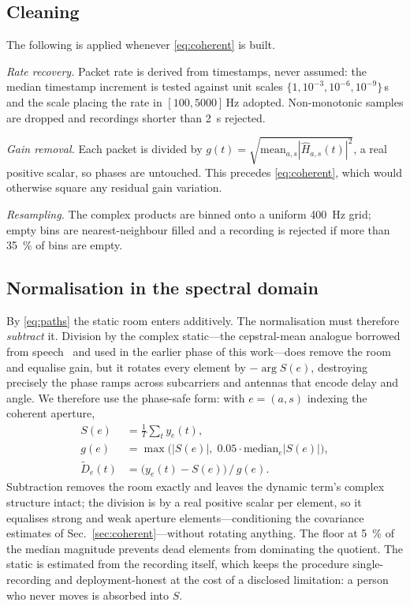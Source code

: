 \documentclass[conference]{IEEEtran}
\begin{document}
\subsection{Cleaning}
\label{sec:clean}

The following is applied whenever \eqref{eq:coherent} is built.

\emph{Rate recovery.} Packet rate is derived from timestamps, never assumed:
the median timestamp increment is tested against unit scales
$\{1, 10^{-3}, 10^{-6}, 10^{-9}\}$\,s and the scale placing the rate in
$[100, 5000]$\,Hz adopted. Non-monotonic samples are dropped and recordings
shorter than \SI{2}{\second} rejected.

\emph{Gain removal.} Each packet is divided by
$g(t) = \sqrt{\mathrm{mean}_{a,s}|\hat H_{a,s}(t)|^2}$, a real positive scalar,
so phases are untouched. This precedes \eqref{eq:coherent}, which would
otherwise square any residual gain variation.

\emph{Resampling.} The complex products are binned onto a uniform
\SI{400}{\hertz} grid; empty bins are nearest-neighbour filled and a recording
is rejected if more than \SI{35}{\percent} of bins are empty.

\subsection{Normalisation in the spectral domain}
\label{sec:norm}

By \eqref{eq:paths} the static room enters additively. The normalisation must
therefore \emph{subtract} it. Division by the complex static---the
cepstral-mean analogue borrowed from speech~\cite{chen2018cepstral} and used in
the earlier phase of this work---does remove the room and equalise gain, but it
rotates every element by $-\arg S(e)$, destroying precisely the phase ramps
across subcarriers and antennas that encode delay and angle. We therefore use
the phase-safe form: with $e = (a, s)$ indexing the coherent aperture,
\begin{align}
S(e) &= \tfrac{1}{T}\textstyle\sum_t y_e(t), \\
g(e) &= \max\!\big(|S(e)|,\; 0.05\cdot\mathrm{median}_e |S(e)|\big), \\
\tilde D_e(t) &= \big(y_e(t) - S(e)\big) \,/\, g(e).
\label{eq:phasesafe}
\end{align}
Subtraction removes the room exactly and leaves the dynamic term's complex
structure intact; the division is by a real positive scalar per element, so it
equalises strong and weak aperture elements---conditioning the covariance
estimates of Sec.~\ref{sec:coherent}---without rotating anything. The floor at
\SI{5}{\percent} of the median magnitude prevents dead elements from dominating
the quotient. The static is estimated from the recording itself, which keeps
the procedure single-recording and deployment-honest at the cost of a disclosed
limitation: a person who never moves is absorbed into $S$.
\end{document}
